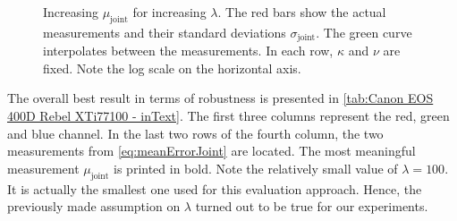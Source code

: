 \begin{figure}[btp]
{  }
  \caption[Increasing $\mu_\text{joint}$ for increasing $\lambda$]{Increasing $\mu_\text{joint}$ for increasing $\lambda$. The red bars show the actual measurements and their standard deviations $\sigma_\text{joint}$. The green curve interpolates between the measurements. In each row, $\kappa$ and $\nu$ are fixed. Note the log scale on the horizontal axis.}
  \label{fig:lambdavariation}
\end{figure}

The overall best result in terms of robustness is presented in \autoref{tab:Canon EOS 400D Rebel XTi77100 - inText}. The first three columns represent the red, green and blue channel. In the last two rows of the fourth column, the two measurements from \autoref{eq:meanErrorJoint} are located. The most meaningful measurement $\mu_\text{joint}$ is printed in bold. Note the relatively small value of $\lambda = 100$. It is actually the smallest one used for this evaluation approach. Hence, the previously made assumption on $\lambda$ turned out to be true for our experiments. 

